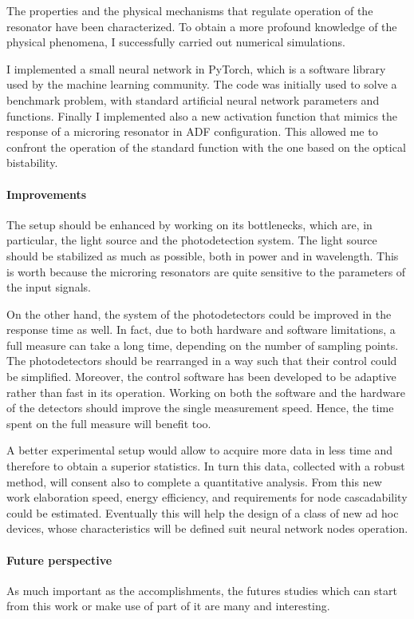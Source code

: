 The properties and the physical mechanisms that regulate operation of the resonator have been characterized.
To obtain a more profound knowledge of the physical phenomena, I successfully carried out numerical simulations.

I implemented a small neural network in PyTorch, which is a software library used by the machine learning community.
The code was initially used to solve a benchmark problem, with standard artificial neural network parameters and functions.
Finally I implemented also a new activation function that mimics the response of a microring resonator in \acl{ADF} configuration.
This allowed me to confront the operation of the standard function with the one based on the optical bistability.

\paragraph{Improvements\\}
The setup should be enhanced by working on its bottlenecks, which are, in particular, the light source and the photodetection system.
The light source should be stabilized as much as possible, both in power and in wavelength.
This is worth because the microring resonators are quite sensitive to the parameters of the input signals.

On the other hand, the system of the photodetectors could be improved in the response time as well.
In fact, due to both hardware and software limitations, a full measure can take a long time, depending on the number of sampling points.
The photodetectors should be rearranged in a way such that their control could be simplified.
Moreover, the control software has been developed to be adaptive rather than fast in its operation.
Working on both the software and the hardware of the detectors should improve the single measurement speed.
Hence, the time spent on the full measure will benefit too.

A better experimental setup would allow to acquire more data in less time and therefore to obtain a superior statistics.
In turn this data, collected with a robust method, will consent also to complete a quantitative analysis.
From this new work elaboration speed, energy efficiency, and requirements for node cascadability could be estimated.
Eventually this will help the design of a class of new ad hoc devices, whose characteristics will be defined suit neural network nodes operation.

\paragraph{Future perspective\\}
As much important as the accomplishments, the futures studies which can start from this work or make use of part of it are many and interesting.

